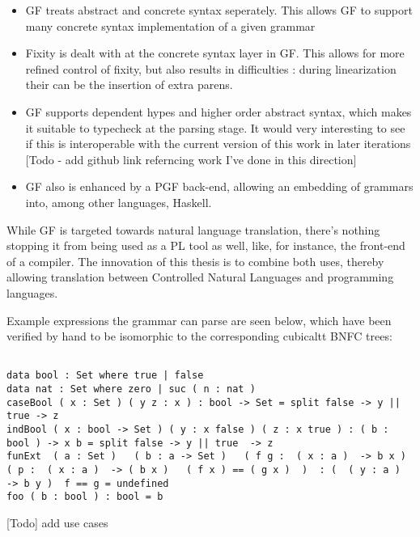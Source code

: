 \documentclass[11pt, a4paper]{article}
\begin{document}
\begin{itemize}[noitemsep]

\item GF treats abstract and concrete syntax seperately. This allows GF to
support many concrete syntax implementation of a given grammar

\item Fixity is dealt with at the concrete syntax layer in GF.  This allows for
more refined control of fixity, but also results in difficulties : during
linearization their can be the insertion of extra parens.

\item GF supports dependent hypes and higher order abstract syntax, which makes
it suitable to typecheck at the parsing stage. It would very interesting to see
if this is interoperable with the current version of this work in later
iterations [Todo - add github link referncing work I've done in this direction]

\item GF also is enhanced by a PGF back-end, allowing an embedding of grammars
into, among other languages, Haskell.

\end{itemize}

While GF is targeted towards natural language translation, there's nothing
stopping it from being used as a PL tool as well, like, for instance, the
front-end of a compiler. The innovation of this thesis is to combine both uses,
thereby allowing translation between Controlled Natural Languages and
programming languages.

Example expressions the grammar can parse are seen below, which have been
verified by hand to be isomorphic to the corresponding cubicaltt BNFC trees:

\begin{verbatim}

data bool : Set where true | false 
data nat : Set where zero | suc ( n : nat )  
caseBool ( x : Set ) ( y z : x ) : bool -> Set = split false -> y || true -> z
indBool ( x : bool -> Set ) ( y : x false ) ( z : x true ) : ( b : bool ) -> x b = split false -> y || true  -> z
funExt  ( a : Set )   ( b : a -> Set )   ( f g :  ( x : a )  -> b x )   ( p :  ( x : a )  -> ( b x )   ( f x ) == ( g x )  )  : (  ( y : a )  -> b y )  f == g = undefined
foo ( b : bool ) : bool = b

\end{verbatim}

[Todo] add use cases
\end{document}
